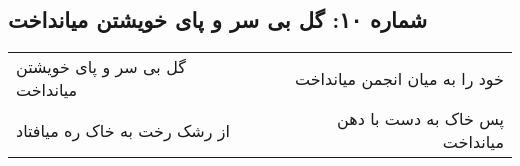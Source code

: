 \begin{center}
\section*{شماره ۱۰: گل بی سر و پای خویشتن میانداخت}
\label{sec:010}
\begin{longtable}{l p{0.5cm} r}
گل بی سر و پای خویشتن میانداخت
&&
خود را به میان انجمن میانداخت
\\
از رشک رخت به خاک ره میافتاد
&&
پس خاک به دست با دهن میانداخت
\\
\end{longtable}
\end{center}
